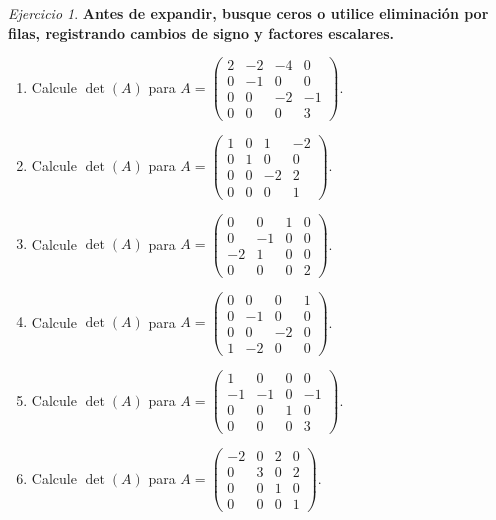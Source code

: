 \documentclass[12pt]{article}
\theoremstyle{remark}
\newtheorem{Ejer}[definicion]{Ejercicio}
\begin{document}
\begin{Ejer}

\textbf{Antes de expandir, busque ceros o utilice eliminación por filas, registrando cambios de signo y factores escalares.}
\begin{enumerate}[start=163]

\item Calcule $\det(A)$ para $A=\begin{pmatrix}2&-2&-4&0\\0&-1&0&0\\0&0&-2&-1\\0&0&0&3\end{pmatrix}$.

\item Calcule $\det(A)$ para $A=\begin{pmatrix}1&0&1&-2\\0&1&0&0\\0&0&-2&2\\0&0&0&1\end{pmatrix}$.

\item Calcule $\det(A)$ para $A=\begin{pmatrix}0&0&1&0\\0&-1&0&0\\-2&1&0&0\\0&0&0&2\end{pmatrix}$.

\item Calcule $\det(A)$ para $A=\begin{pmatrix}0&0&0&1\\0&-1&0&0\\0&0&-2&0\\1&-2&0&0\end{pmatrix}$.

\item Calcule $\det(A)$ para $A=\begin{pmatrix}1&0&0&0\\-1&-1&0&-1\\0&0&1&0\\0&0&0&3\end{pmatrix}$.

\item Calcule $\det(A)$ para $A=\begin{pmatrix}-2&0&2&0\\0&3&0&2\\0&0&1&0\\0&0&0&1\end{pmatrix}$.


\end{enumerate}
\end{Ejer}
\end{document}
